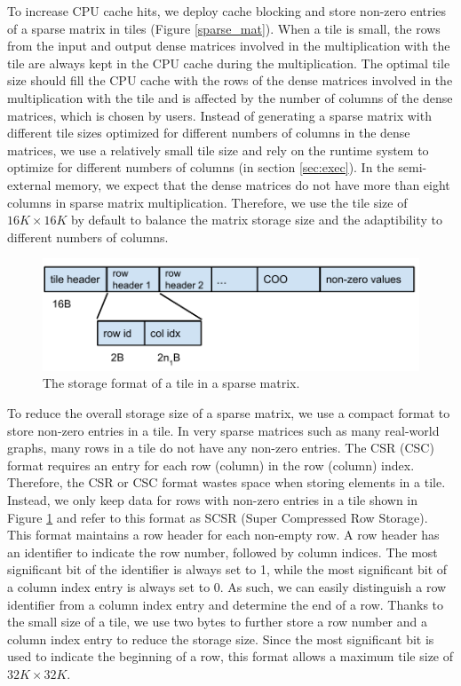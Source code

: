 To increase CPU cache hits, we deploy cache blocking \cite{Im04} and store
non-zero entries of a sparse matrix in tiles (Figure \ref{sparse_mat}).
When a tile is small, the rows from the input and output dense matrices
involved in the multiplication with the tile are always kept in the CPU cache
during the multiplication. The optimal tile size should fill the CPU cache
with the rows of the dense matrices involved in the multiplication with
the tile and is affected by the number of columns of the dense matrices,
which is chosen by users. Instead of generating a sparse matrix with
different tile sizes optimized for different numbers of columns in the dense
matrices, we use a relatively small tile size and rely on the runtime system
to optimize for different numbers of columns (in section \ref{sec:exec}).
In the semi-external memory, we expect that the dense matrices do not
have more than eight columns in sparse matrix multiplication. Therefore, we
use the tile size of $16K \times 16K$ by default to balance the matrix storage
size and the adaptibility to different numbers of columns.

\begin{figure}
\centering
\includegraphics[scale=0.5]{./tile_format.pdf}
\caption{The storage format of a tile in a sparse matrix.}
\label{tile_format}
\end{figure}

To reduce the overall storage size of a sparse matrix, we use a compact format
to store non-zero entries in a tile. In very sparse matrices such as
many real-world graphs, many rows in a tile do not have any non-zero entries.
The CSR (CSC) format requires an entry for each row (column) in the row
(column) index. Therefore, the CSR or CSC format wastes space when storing elements
in a tile. Instead, we only keep data for rows with non-zero entries in a tile
shown in Figure \ref{tile_format} and refer to this format as SCSR (Super
Compressed Row Storage). This format maintains a row header for each non-empty
row. A row header has an identifier to indicate the row number, followed by
column indices. 
The most significant bit of the identifier is always set to 1, while the most
significant bit of a column index entry is always set to 0. As such, we can easily
distinguish a row identifier from a column index entry and determine the end
of a row. Thanks to the small size of a tile, we use two bytes to further store a row
number and a column index entry to reduce the storage size. Since the most
significant bit is used to indicate the beginning of a row, this format allows
a maximum tile size of $32K \times 32K$.

